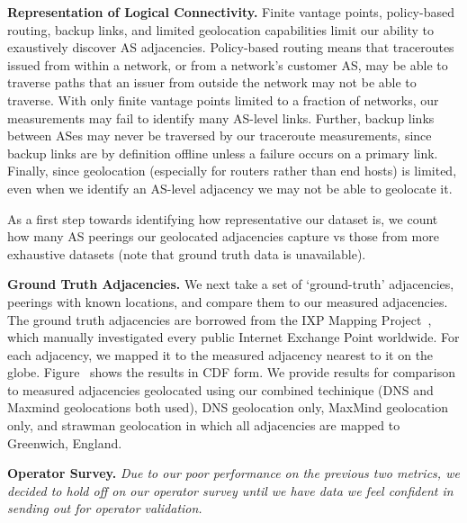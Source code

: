 {            {\bf Representation of Logical Connectivity.} 
            Finite vantage points, policy-based routing, backup links, and limited geolocation capabilities limit our ability to exaustively discover AS adjacencies. 
            Policy-based routing means that traceroutes issued from within a network, or from a network's customer AS, may be able to traverse paths that an issuer from outside the network may not be able to traverse.
            With only finite vantage points limited to a fraction of networks, our measurements may fail to identify many AS-level links.
            Further, backup links between ASes may never be traversed by our traceroute measurements, since backup links are by definition offline unless a failure occurs on a primary link.
            Finally, since geolocation (especially for routers rather than end hosts) is limited, even when we identify an AS-level adjacency we may not be able to geolocate it.
            
            As a first step towards identifying how representative our dataset is, we count how many AS peerings our geolocated adjacencies capture vs those from more exhaustive datasets (note that ground truth data is unavailable).

            {\bf Ground Truth Adjacencies.}
           We next take a set of `ground-truth' adjacencies, peerings with known locations, and compare them to our measured adjacencies. 
           The ground truth adjacencies are borrowed from the IXP Mapping Project~\cite{ixps-mapped}, which manually investigated every public Internet Exchange Point worldwide.
            For each adjacency, we mapped it to the measured adjacency nearest to it on the globe.
            Figure~\cite{fig:closestadjacency} shows the results in CDF form.
            We provide results for comparison to measured adjacencies geolocated using our combined techinique (DNS and Maxmind geolocations both used), DNS geolocation only, MaxMind geolocation only, and strawman geolocation in which all adjacencies are mapped to Greenwich, England.




            {\bf Operator Survey.} {\it Due to our poor performance on the previous two metrics, we decided to hold off on our operator survey until we have data we feel confident in sending out for operator validation.}
}


